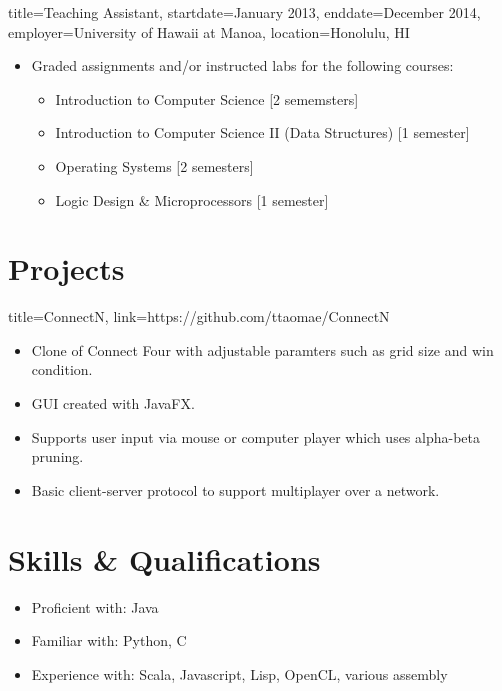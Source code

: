 \documentclass{resume}
\begin{document}
\begin{job}{title=Teaching Assistant,
            startdate=January 2013,
            enddate=December 2014,
            employer=University of Hawaii at Manoa,
            location={Honolulu, HI}}
    \begin{itemize}
        \item{Graded assignments and/or instructed labs for the following courses:}
        \begin{itemize}
            \item{Introduction to Computer Science [2 sememsters]}
            \item{Introduction to Computer Science II (Data Structures) [1 semester]}
            \item{Operating Systems [2 semesters]}
            \item{Logic Design \& Microprocessors [1 semester]}
        \end{itemize}
    \end{itemize}
\end{job}

\section*{Projects}
\begin{project}{title=ConnectN, link=https://github.com/ttaomae/ConnectN}
    \begin{itemize}
        \item{Clone of Connect Four with adjustable paramters such as grid size and win condition.}
        \item{GUI created with JavaFX.}
        \item{Supports user input via mouse or computer player which uses alpha-beta pruning.}
        \item{Basic client-server protocol to support multiplayer over a network.}
    \end{itemize}
\end{project}

\section*{Skills \& Qualifications}
\begin{itemize}
    \item{Proficient with: Java}
    \item{Familiar with: Python, C}
    \item{Experience with: Scala, Javascript, Lisp, OpenCL, various assembly}
\end{itemize}
\end{document}
